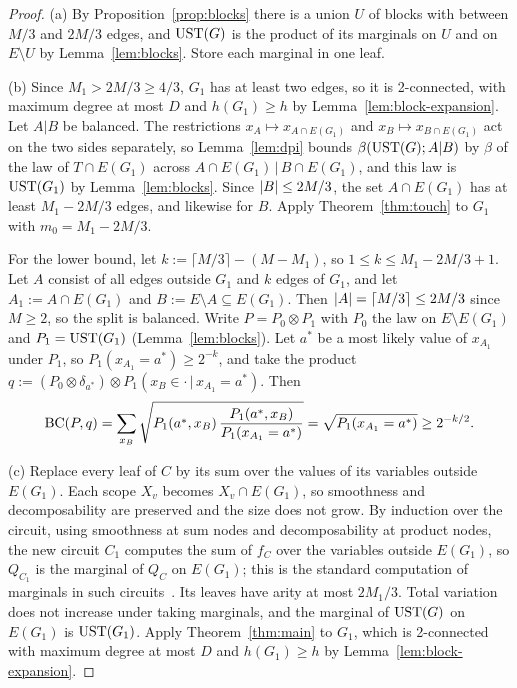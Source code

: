 \begin{proof}
(a) By Proposition~\ref{prop:blocks} there is a union $U$ of blocks with between $M/3$ and $2M/3$ edges, and $\mathrm{UST}(G)$ is the product of its marginals on $U$ and on $E\setminus U$ by Lemma~\ref{lem:blocks}. Store each marginal in one leaf.

(b) Since $M_1>2M/3\ge4/3$, $G_1$ has at least two edges, so it is 2-connected, with maximum degree at most $D$ and $h(G_1)\ge h$ by Lemma~\ref{lem:block-expansion}. Let $A|B$ be balanced. The restrictions $x_A\mapsto x_{A\cap E(G_1)}$ and $x_B\mapsto x_{B\cap E(G_1)}$ act on the two sides separately, so Lemma~\ref{lem:dpi} bounds $\beta(\mathrm{UST}(G);A|B)$ by $\beta$ of the law of $T\cap E(G_1)$ across $A\cap E(G_1)\,|\,B\cap E(G_1)$, and this law is $\mathrm{UST}(G_1)$ by Lemma~\ref{lem:blocks}. Since $\lvert B\rvert\le2M/3$, the set $A\cap E(G_1)$ has at least $M_1-2M/3$ edges, and likewise for $B$. Apply Theorem~\ref{thm:touch} to $G_1$ with $m_0=M_1-2M/3$.

For the lower bound, let $k:=\lceil M/3\rceil-(M-M_1)$, so $1\le k\le M_1-2M/3+1$. Let $A$ consist of all edges outside $G_1$ and $k$ edges of $G_1$, and let $A_1:=A\cap E(G_1)$ and $B:=E\setminus A\subseteq E(G_1)$. Then $\lvert A\rvert=\lceil M/3\rceil\le2M/3$ since $M\ge2$, so the split is balanced. Write $P=P_0\otimes P_1$ with $P_0$ the law on $E\setminus E(G_1)$ and $P_1=\mathrm{UST}(G_1)$ (Lemma~\ref{lem:blocks}). Let $a^*$ be a most likely value of $x_{A_1}$ under $P_1$, so $P_1(x_{A_1}=a^*)\ge2^{-k}$, and take the product $q:=(P_0\otimes\delta_{a^*})\otimes P_1(x_B\in\cdot\,|\,x_{A_1}=a^*)$. Then
\[
  \mathrm{BC}(P,q)=\sum_{x_B}\sqrt{P_1(a^*,x_B)\,\frac{P_1(a^*,x_B)}{P_1(x_{A_1}=a^*)}}=\sqrt{P_1(x_{A_1}=a^*)}\ge2^{-k/2}.
\]

(c) Replace every leaf of $C$ by its sum over the values of its variables outside $E(G_1)$. Each scope $X_v$ becomes $X_v\cap E(G_1)$, so smoothness and decomposability are preserved and the size does not grow. By induction over the circuit, using smoothness at sum nodes and decomposability at product nodes, the new circuit $C_1$ computes the sum of $f_C$ over the variables outside $E(G_1)$, so $Q_{C_1}$ is the marginal of $Q_C$ on $E(G_1)$; this is the standard computation of marginals in such circuits~\cite{ChoiVergariVdB20}. Its leaves have arity at most $2M_1/3$. Total variation does not increase under taking marginals, and the marginal of $\mathrm{UST}(G)$ on $E(G_1)$ is $\mathrm{UST}(G_1)$. Apply Theorem~\ref{thm:main} to $G_1$, which is 2-connected with maximum degree at most $D$ and $h(G_1)\ge h$ by Lemma~\ref{lem:block-expansion}.
\end{proof}


